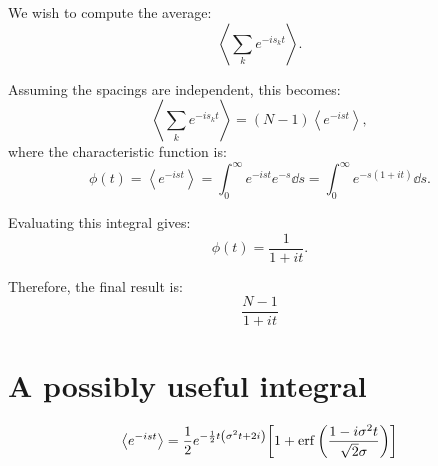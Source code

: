 \documentclass[10pt,a4paper]{article}
\begin{document}
We wish to compute the average:
\[
\left\langle \sum_k e^{-i s_k t} \right\rangle.
\]

Assuming the spacings are independent, this becomes:
\[
\left\langle \sum_k e^{-i s_k t} \right\rangle = (N-1) \left\langle e^{-i s t} \right\rangle,
\]
where the characteristic function is:
\[
\phi(t) = \left\langle e^{-i s t} \right\rangle = \int_0^\infty e^{-i s t} e^{-s} \dd{s} = \int_0^\infty e^{-s(1 + i t)} \dd{s}.
\]

Evaluating this integral gives:
\[
\phi(t) = \frac{1}{1 + i t}.
\]

Therefore, the final result is:
\[
\boxed{\frac{N-1}{1+it}}
\]

\section{A possibly useful integral}
\begin{equation}
\expval{e^{-ist}} =
\frac{1}{2}
e^{-\frac{1}{2} t \left(\sigma ^2 t+2 i\right)} 
\qty[
1 + \erf\qty(\frac{1 - i\sigma^2 t}{\sqrt{2}\sigma})
]
\end{equation}



\printbibliography
\end{document}
